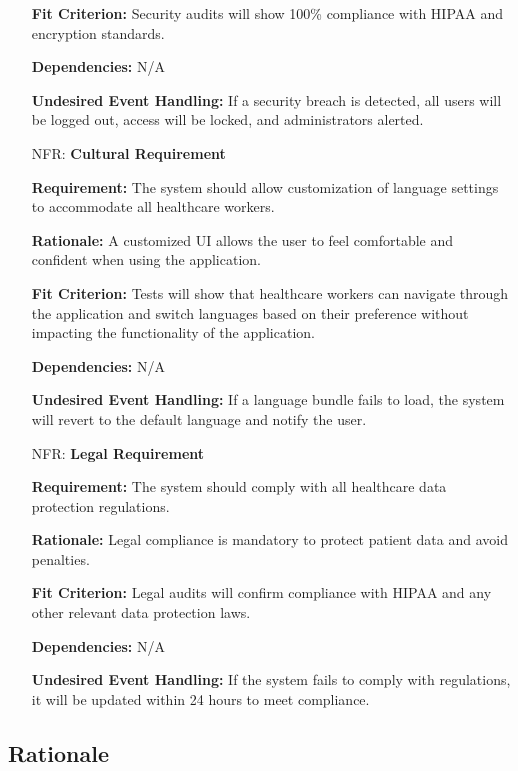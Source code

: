 \documentclass[12pt]{article}
\newcounter{nfrnum} %
\begin{document}
\begin{itemize}
    \textbf{Fit Criterion:} Security audits will show 100\% compliance with HIPAA and encryption standards.  

    \textbf{Dependencies:} N/A

    \textbf{Undesired Event Handling:} If a security breach is detected, all users will be logged out, access will be locked, and administrators alerted.

\item[NFR\refstepcounter{nfrnum}\thenfrnum \label{NFR_Cultural}:] \textbf{Cultural Requirement}

    \textbf{Requirement:} The system should allow customization of language settings to accommodate all healthcare workers.

    \textbf{Rationale:} A customized UI allows the user to feel comfortable and confident when using the application.

    \textbf{Fit Criterion:} Tests will show that healthcare workers can navigate through the application and switch languages based on their preference without impacting the functionality of the application.

    \textbf{Dependencies:} N/A

    \textbf{Undesired Event Handling:} If a language bundle fails to load, the system will revert to the default language and notify the user.

\item[NFR\refstepcounter{nfrnum}\thenfrnum \label{NFR_Legal}:] \textbf{Legal Requirement}

    \textbf{Requirement:} The system should comply with all healthcare data protection regulations. 

    \textbf{Rationale:} Legal compliance is mandatory to protect patient data and avoid penalties.  

    \textbf{Fit Criterion:} Legal audits will confirm compliance with HIPAA and any other relevant data protection laws.  

    \textbf{Dependencies:} N/A

    \textbf{Undesired Event Handling:} If the system fails to comply with regulations, it will be updated within 24 hours to meet compliance.

\end{itemize}

\subsection{Rationale}
\end{document}
